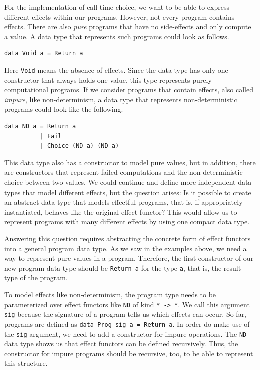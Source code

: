 \documentclass[a4paper, 11pt, fleqn, twoside, abstract=on]{scrreprt}
\newcommand{\hinl}[1]{\texttt{#1}}
\begin{document}
For the implementation of call-time choice, we want to be able to express different effects within our programs.
However, not every program contains effects.
There are also \textit{pure} programs that have no side-effects and only compute a value.
A data type that represents such programs could look as follows.

\begin{verbatim}
data Void a = Return a
\end{verbatim}

Here \hinl{Void} means the absence of effects. Since the data type has only one constructor that always holds one value, this type represents purely computational programs.
If we consider programs that contain effects, also called \textit{impure}, like non-determinism, a data type that represents non-deterministic programs could look like the following.

\begin{verbatim}
data ND a = Return a
          | Fail
          | Choice (ND a) (ND a)
\end{verbatim}

This data type also has a constructor to model pure values, but in addition, there are constructors that represent failed computations and the non-deterministic choice between two values.
We could continue and define more independent data types that model different effects, but the question arises: Is it possible to create an abstract data type that models effectful programs, that is, if appropriately instantiated, behaves like the original effect functor?
This would allow us to represent programs with many different effects by using one compact data type.

Answering this question requires abstracting the concrete form of effect functors into a general program data type.
As we saw in the examples above, we need a way to represent pure values in a program.
Therefore, the first constructor of our new program data type should be \hinl{Return a} for the type \hinl{a}, that is, the result type of the program.

To model effects like non-determinism, the program type needs to be parameterized over effect functors like \hinl{ND} of kind \hinl{* -> *}.
We call this argument \hinl{sig} because the signature of a program tells us which effects can occur.
So far, programs are defined as \hinl{data Prog sig a = Return a}.
In order do make use of the \hinl{sig} argument, we need to add a constructor for impure operations.
The \hinl{ND} data type shows us that effect functors can be defined recursively.
Thus, the constructor for impure programs should be recursive, too, to be able to represent this structure.
\end{document}
